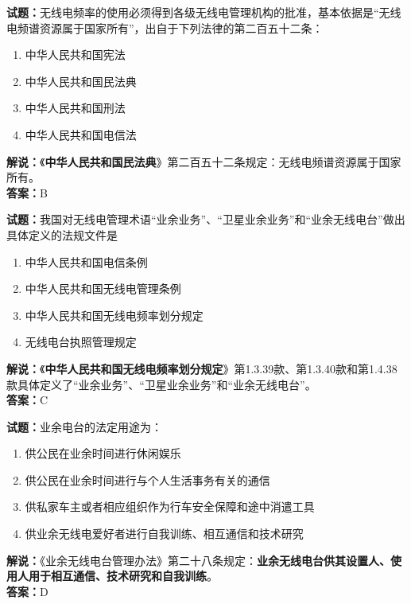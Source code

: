 \documentclass{ctexbook}
\begin{document}
\bigskip


\noindent\textbf{试题：}无线电频率的使用必须得到各级无线电管理机构的批准，基本依据是“无线电频谱资源属于国家所有”，出自于下列法律的第二百五十二条： 

\begin{enumerate}[leftmargin=3em]
	\item 中华人民共和国宪法
	\item 中华人民共和国民法典
	\item 中华人民共和国刑法
	\item 中华人民共和国电信法
\end{enumerate}

\noindent\textbf{解说：}《\textbf{中华人民共和国民法典}》第二百五十二条规定：无线电频谱资源属于国家所有。\\\noindent\textbf{答案：}B

\bigskip


\noindent\textbf{试题：}我国对无线电管理术语“业余业务”、“卫星业余业务”和“业余无线电台”做出具体定义的法规文件是 
\begin{enumerate}[leftmargin=3em]
	\item 中华人民共和国电信条例
	\item 中华人民共和国无线电管理条例
	\item 中华人民共和国无线电频率划分规定
	\item 无线电台执照管理规定
\end{enumerate}
\textbf{解说：}《\textbf{中华人民共和国无线电频率划分规定}》第1.3.39款、第1.3.40款和第1.4.38款具体定义了“业余业务”、“卫星业余业务”和“业余无线电台”。\\\noindent\textbf{答案：}C

\bigskip


\noindent\textbf{试题：}业余电台的法定用途为：
\begin{enumerate}[leftmargin=3em]
	\item 供公民在业余时间进行休闲娱乐
	\item 供公民在业余时间进行与个人生活事务有关的通信
	\item 供私家车主或者相应组织作为行车安全保障和途中消遣工具
	\item 供业余无线电爱好者进行自我训练、相互通信和技术研究
\end{enumerate}
\noindent\textbf{解说：}《业余无线电台管理办法》第二十八条规定：\textbf{业余无线电台供其设置人、使用人用于相互通信、技术研究和自我训练}。\\\noindent\textbf{答案：}D


\bigskip
\end{document}
